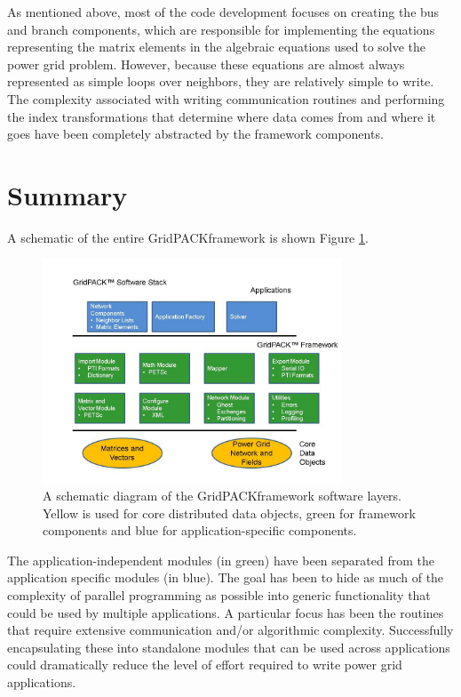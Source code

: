 \documentclass[preprint]{acm_proc_article-sp}
\begin{document}
As mentioned above, most of the code development focuses on creating the bus and
branch components, which are responsible for implementing the equations
representing the matrix elements in the algebraic equations used to solve the
power grid problem. However, because these equations are almost always
represented as simple loops over neighbors, they are relatively simple to write.
The complexity associated with writing communication routines and performing the
index transformations that determine where data comes from and where it goes
have been completely abstracted by the framework components.

\section{Summary}
A schematic of the entire GridPACK\texttrademark framework is shown Figure
\ref{stack}.
\begin{figure}
\centering
\includegraphics[width=3.5in,keepaspectratio=true]{./Fig1}
\caption{\label{stack} A schematic diagram of the GridPACK\texttrademark framework
software layers.
Yellow is used for core distributed data objects, green for framework components
and blue for application-specific components.}
\end{figure}
The application-independent modules (in green) have been separated from
the application specific modules (in blue). The goal has been to
hide as much of the complexity of parallel programming as possible into
generic functionality that could be used by multiple applications. A
particular focus has been the routines that require extensive communication
and/or algorithmic complexity. Successfully encapsulating these into
standalone modules that can be used across applications could dramatically
reduce the level of effort required to write power grid applications.
\end{document}
